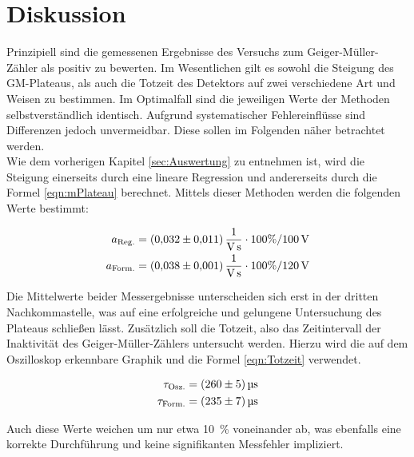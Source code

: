 %

%

\section{Diskussion}
\label{sec:Diskussion}

\noindent Prinzipiell sind die gemessenen Ergebnisse des Versuchs zum Geiger-Müller-Zähler als positiv zu bewerten. Im Wesentlichen 
gilt es sowohl die Steigung des GM-Plateaus, als auch die Totzeit des Detektors auf zwei verschiedene Art und Weisen zu bestimmen. 
Im Optimalfall sind die jeweiligen Werte der Methoden selbstverständlich identisch. Aufgrund systematischer Fehlereinflüsse
sind Differenzen jedoch unvermeidbar. Diese sollen im Folgenden näher betrachtet werden.\\

\noindent Wie dem vorherigen Kapitel \ref{sec:Auswertung} zu entnehmen ist, wird die Steigung einerseits durch eine lineare 
Regression und andererseits durch die Formel \eqref{eqn:mPlateau} berechnet. Mittels dieser Methoden werden die folgenden 
Werte bestimmt:

\begin{align*}
    a_\text{Reg.} &= \qty{0.032\pm0.011}{\per \volt \per \second} \cdot 100\% / \qty{100}{\volt}\\
    a_\text{Form.} &= \qty{0.038\pm0.001}{\per \volt \per \second} \cdot 100\% / \qty{120}{\volt}
\end{align*}

\noindent Die Mittelwerte beider Messergebnisse unterscheiden sich erst in der dritten Nachkommastelle, was auf eine erfolgreiche 
und gelungene Untersuchung des Plateaus schließen lässt. Zusätzlich soll die Totzeit, also das Zeitintervall der Inaktivität des 
Geiger-Müller-Zählers untersucht werden. Hierzu wird die auf dem Oszilloskop erkennbare Graphik und die Formel \eqref{eqn:Totzeit}
verwendet.

\begin{align*}
    \tau_\text{Osz.} &= \qty{260\pm5}{\micro \second}\\
    \tau_\text{Form.} &= \qty{235\pm7}{\micro \second}
\end{align*}

\noindent Auch diese Werte weichen um nur etwa \qty{10}{\percent} voneinander ab, was ebenfalls eine korrekte Durchführung und keine 
signifikanten Messfehler impliziert.\\

